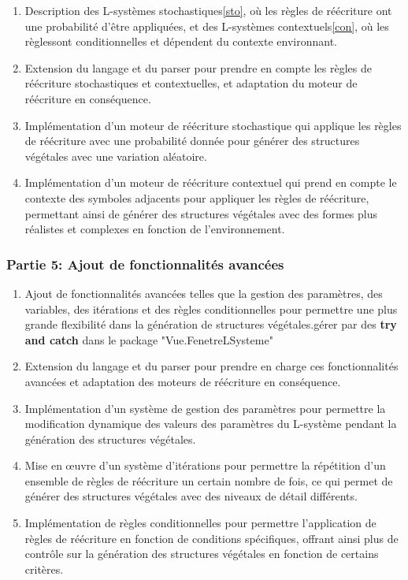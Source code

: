   \begin{enumerate}
      \item Description des L-systèmes stochastiques\ref{sto}, où les règles de réécriture ont une probabilité d'être appliquées, et des L-systèmes contextuels\ref{con}, où les règlessont conditionnelles et dépendent du contexte environnant.

    \item Extension du langage et du parser pour prendre en compte les règles de réécriture stochastiques et contextuelles, et adaptation du moteur de réécriture en conséquence.
    \item Implémentation d'un moteur de réécriture stochastique qui applique les règles de réécriture avec une probabilité donnée pour générer des structures végétales avec une variation aléatoire.
    \item Implémentation d'un moteur de réécriture contextuel qui prend en compte le contexte des symboles adjacents pour appliquer les règles de réécriture, permettant ainsi de générer des structures végétales avec des formes plus réalistes et complexes en fonction de l'environnement.
  \end{enumerate}  

\subsubsection{Partie 5: Ajout de fonctionnalités avancées}

\begin{enumerate}
    \item  Ajout de fonctionnalités avancées telles que la gestion des paramètres, des variables, des itérations et des règles conditionnelles pour permettre une plus grande flexibilité dans la génération de structures végétales.gérer par des \textbf{try and catch} dans le package "Vue.FenetreLSysteme"
    \item Extension du langage et du parser pour prendre en charge ces fonctionnalités avancées et adaptation des moteurs de réécriture en conséquence.
    \item  Implémentation d'un système de gestion des paramètres pour permettre la modification dynamique des valeurs des paramètres du L-système pendant la génération des structures végétales.
    \item Mise en œuvre d'un système d'itérations pour permettre la répétition d'un ensemble de règles de réécriture un certain nombre de fois, ce qui permet de générer des structures végétales avec des niveaux de détail différents.
    \item Implémentation de règles conditionnelles pour permettre l'application de règles de réécriture en fonction de conditions spécifiques, offrant ainsi plus de contrôle sur la génération des structures végétales en fonction de certains critères.
\end{enumerate}
   

